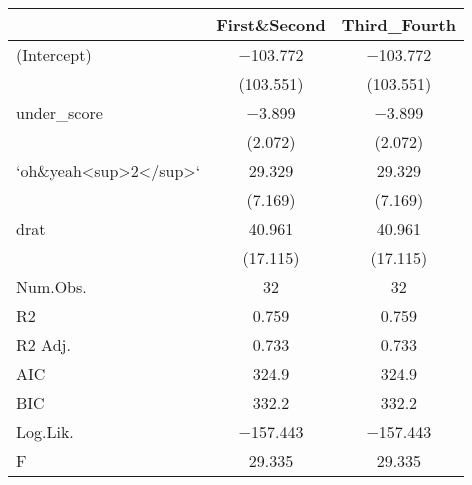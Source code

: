 \begin{table}
\centering
\begin{tabular}[t]{lcc}
\toprule
  & First\&Second & Third\_Fourth\\
\midrule
(Intercept) & \num{-103.772} & \num{-103.772}\\
 & (\num{103.551}) & (\num{103.551})\\
under\_score & \num{-3.899} & \num{-3.899}\\
 & (\num{2.072}) & (\num{2.072})\\
`oh\&yeah<sup>2</sup>` & \num{29.329} & \num{29.329}\\
 & (\num{7.169}) & (\num{7.169})\\
drat & \num{40.961} & \num{40.961}\\
 & (\num{17.115}) & (\num{17.115})\\
\midrule
Num.Obs. & \num{32} & \num{32}\\
R2 & \num{0.759} & \num{0.759}\\
R2 Adj. & \num{0.733} & \num{0.733}\\
AIC & \num{324.9} & \num{324.9}\\
BIC & \num{332.2} & \num{332.2}\\
Log.Lik. & \num{-157.443} & \num{-157.443}\\
F & \num{29.335} & \num{29.335}\\
\bottomrule
\end{tabular}
\end{table}
